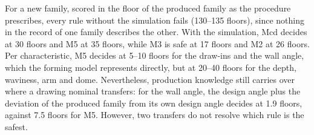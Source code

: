 \documentclass[pdflatex,sn-basic,lineno]{sn-jnl}
\begin{document}
For a new family, scored in the floor of the produced family as the procedure prescribes, every rule without the simulation fails (130--135 floors), since nothing in the record of one family describes the other. With the simulation, Mcd decides at 30 floors and M5 at 35 floors, while M3 is safe at 17 floors and M2 at 26 floors. Per characteristic, M5 decides at 5--10 floors for the draw-ins and the wall angle, which the forming model represents directly, but at 20--40 floors for the depth, waviness, arm and dome. Nevertheless, production knowledge still carries over where a drawing nominal transfers: for the wall angle, the design angle plus the deviation of the produced family from its own design angle decides at 1.9 floors, against 7.5 floors for M5. However, two transfers do not resolve which rule is the safest.
\end{document}
